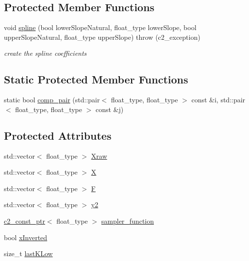 \subsection*{Protected Member Functions}
\begin{DoxyCompactItemize}
\item 
void \hyperlink{classinterpolating__function__p_aa2cfb88d95864c68d5be6e4812f8ec51}{spline} (bool lower\+Slope\+Natural, float\+\_\+type lower\+Slope, bool upper\+Slope\+Natural, float\+\_\+type upper\+Slope)  throw (c2\+\_\+exception)
\begin{DoxyCompactList}\small\item\em create the spline coefficients \end{DoxyCompactList}\end{DoxyCompactItemize}
\subsection*{Static Protected Member Functions}
\begin{DoxyCompactItemize}
\item 
static bool \hyperlink{classinterpolating__function__p_a06bbf33a20dac7faa95458cf384e33a2}{comp\+\_\+pair} (std\+::pair$<$ float\+\_\+type, float\+\_\+type $>$ const \&i, std\+::pair$<$ float\+\_\+type, float\+\_\+type $>$ const \&j)
\end{DoxyCompactItemize}
\subsection*{Protected Attributes}
\begin{DoxyCompactItemize}
\item 
std\+::vector$<$ float\+\_\+type $>$ \hyperlink{classinterpolating__function__p_acd71560b0fc125d028847ad906207a62}{Xraw}
\item 
std\+::vector$<$ float\+\_\+type $>$ \hyperlink{classinterpolating__function__p_a2ae94315914ef71afb6e9f84f8383e61}{X}
\item 
std\+::vector$<$ float\+\_\+type $>$ \hyperlink{classinterpolating__function__p_a481dee592a5a5ec9ec3fb1aae31a8865}{F}
\item 
std\+::vector$<$ float\+\_\+type $>$ \hyperlink{classinterpolating__function__p_a7d9729f0ccd503a4eb2f1880f035805a}{y2}
\item 
\hyperlink{classc2__const__ptr}{c2\+\_\+const\+\_\+ptr}$<$ float\+\_\+type $>$ \hyperlink{classinterpolating__function__p_aa0c58578b4b40ec3f9154cb06d18764e}{sampler\+\_\+function}
\item 
bool \hyperlink{classinterpolating__function__p_a2eaaea5d2083d93d0a8d4825a9f5bbfe}{x\+Inverted}
\item 
size\+\_\+t \hyperlink{classinterpolating__function__p_a2f051073f09c909c5770a324862099b6}{last\+K\+Low}
\end{DoxyCompactItemize}


